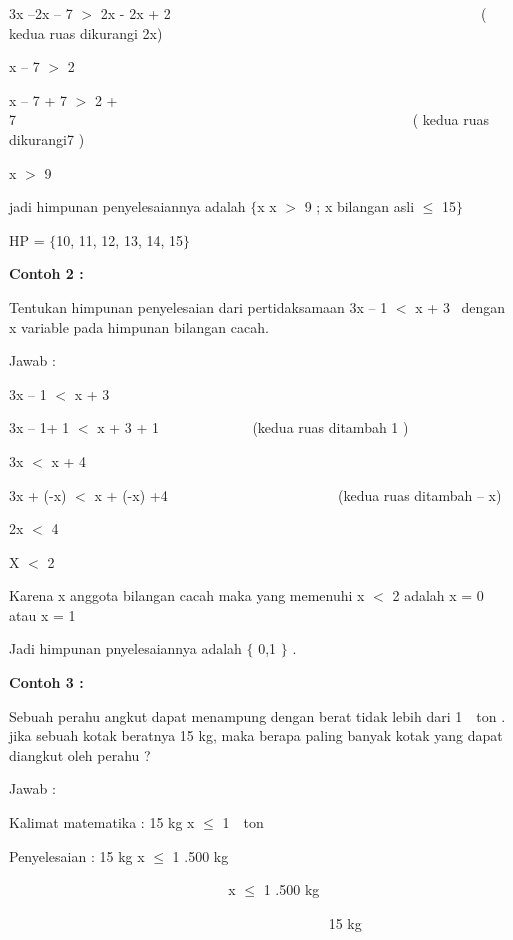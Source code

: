 \documentclass[11pt,fleqn]{book} %
\begin{document}
\noindent 3x --2x -- 7 $>$ 2x - 2x + 2 ~~~~~~~~~~~~~~~~~~~~~~~~~~~~~~~~~~~~~~~~~~~ ( kedua ruas dikurangi 2x)

\noindent x -- 7 $>$ 2

\noindent x -- 7 + 7 $>$ 2 + 7~~~~~~~~~~~~~~~~~~~~~~~~~~~~~~~~~~~~~~~~~~~~~~~~~~~~~~~~ ( kedua ruas dikurangi7 )~~~~~~~

\noindent x $>$ 9

\noindent 

\noindent jadi himpunan penyelesaiannya adalah $\{$x {\textbar} x $>$ 9 ; x bilangan asli $\mathrm{\le}$ 15$\}$

\noindent HP = $\{$10, 11, 12, 13, 14, 15$\}$

\noindent \textbf{}

\noindent \textbf{Contoh 2 :}

\noindent Tentukan himpunan penyelesaian dari pertidaksamaan 3x -- 1 $<$ x + 3~ dengan x variable pada himpunan bilangan cacah.

\noindent Jawab :

\noindent 3x -- 1 $<$ x + 3

\noindent 3x -- 1+ 1 $<$ x + 3 + 1 ~~~~~~~~~~~~ (kedua ruas ditambah 1 )

\noindent 3x $<$ x + 4~

\noindent 3x + (-x) $<$ x + (-x) +4~ ~~~~~~~~~~~~~~~~~~~~~~ (kedua ruas ditambah -- x)

\noindent 2x $<$ 4

\noindent X $<$ 2

\noindent Karena x anggota bilangan cacah maka yang memenuhi x $<$ 2 adalah x = 0 atau x = 1

\noindent Jadi himpunan pnyelesaiannya adalah $\{$ 0,1 $\}$ .

\noindent \textbf{}

\noindent \textbf{Contoh 3 :}

\noindent Sebuah perahu angkut dapat menampung dengan berat tidak lebih dari 1~~ton . jika sebuah kotak beratnya 15 kg, maka berapa paling banyak kotak yang dapat diangkut oleh perahu ?

\noindent Jawab :

\noindent Kalimat matematika : 15 kg x $\mathrm{\le}$ 1~~ton

\noindent Penyelesaian : 15 kg x $\mathrm{\le}$ 1 .500 kg

\noindent ~~~~~~~~~~~~~~~~~~~~~~~ ~~~~~~~ x $\mathrm{\le}$ 1 .500 kg

\noindent ~~~~~~~~~~~~~~~~~~~~~~~~~~~~~~~~~~~~~~~~~~~~~ 15 kg
\end{document}
